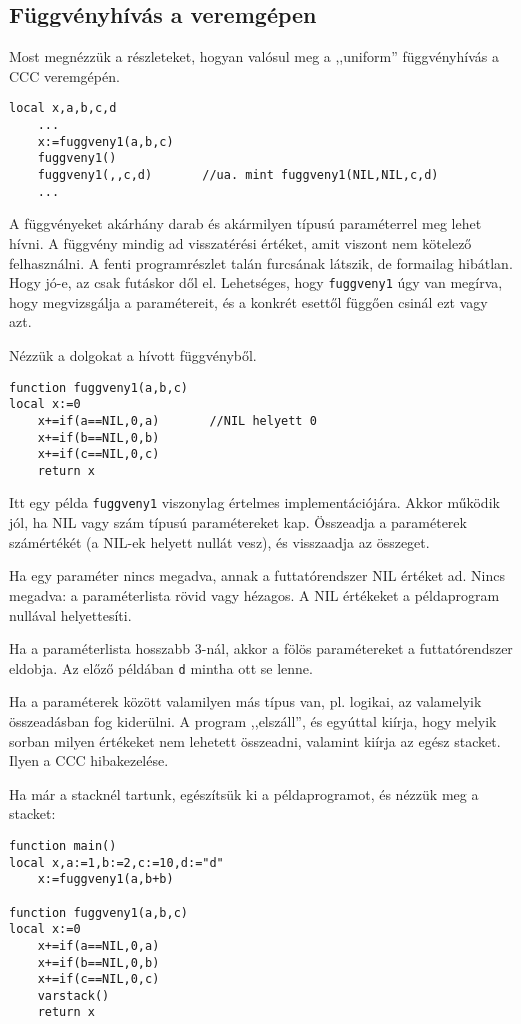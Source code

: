 \subsection{Függvényhívás a veremgépen}

Most megnézzük a részleteket,
hogyan valósul meg a ,,uniform'' függvényhívás a CCC veremgépén.

\begin{verbatim}
local x,a,b,c,d
    ...
    x:=fuggveny1(a,b,c)
    fuggveny1()
    fuggveny1(,,c,d)       //ua. mint fuggveny1(NIL,NIL,c,d)
    ...
\end{verbatim}
A függvényeket akárhány darab és akármilyen típusú paraméterrel 
meg lehet hívni. A függvény mindig ad visszatérési értéket, amit viszont
nem kötelező felhasználni. A fenti programrészlet talán furcsának látszik,
de formailag hibátlan. Hogy jó-e, az csak futáskor dől el. 
Lehetséges, hogy \verb!fuggveny1! úgy van megírva, hogy megvizsgálja
a paramétereit, és a konkrét esettől függően csinál ezt vagy azt.

Nézzük a dolgokat a hívott függvényből.
\begin{verbatim}
function fuggveny1(a,b,c)
local x:=0
    x+=if(a==NIL,0,a)       //NIL helyett 0
    x+=if(b==NIL,0,b)
    x+=if(c==NIL,0,c)
    return x
\end{verbatim}
Itt egy példa \verb!fuggveny1! viszonylag értelmes implementációjára.
Akkor működik jól, ha NIL vagy szám típusú paramétereket kap. Összeadja
a paraméterek számértékét (a NIL-ek helyett nullát vesz), és visszaadja az összeget.

Ha egy paraméter nincs megadva, annak a futtatórendszer 
NIL értéket ad. Nincs megadva: a paraméterlista rövid vagy hézagos.
A NIL értékeket a példaprogram nullával helyettesíti.

Ha a paraméterlista hosszabb 3-nál, akkor a fölös paramétereket 
a futtatórendszer eldobja. Az előző példában \verb!d! mintha ott se lenne.

Ha a paraméterek között valamilyen más típus van, pl. logikai, 
az valamelyik összeadásban fog kiderülni. A program ,,elszáll'',
és egyúttal kiírja, hogy melyik sorban milyen értékeket nem lehetett összeadni, 
valamint kiírja az egész stacket. Ilyen a CCC hibakezelése.

Ha már a stacknél tartunk, egészítsük ki a példaprogramot, 
és nézzük meg a stacket:

\begin{verbatim}
function main()
local x,a:=1,b:=2,c:=10,d:="d"
    x:=fuggveny1(a,b+b)

function fuggveny1(a,b,c)
local x:=0
    x+=if(a==NIL,0,a)
    x+=if(b==NIL,0,b)
    x+=if(c==NIL,0,c)
    varstack()
    return x
\end{verbatim}

